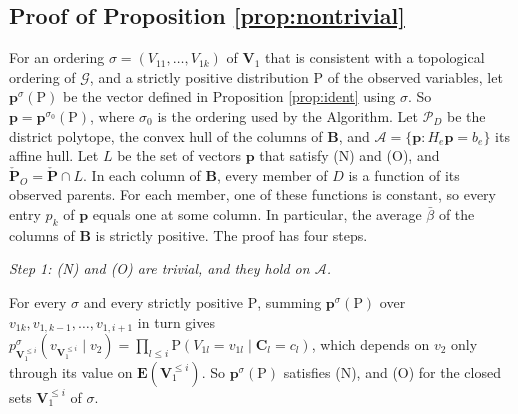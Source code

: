 \documentclass[12pt]{article}
\def\Pr{{\mathrm{P}}}
\newcommand{\bV}{\boldsymbol{V}}
\begin{document}
\subsection*{Proof of Proposition \ref{prop:nontrivial}}

For an ordering $\sigma = (V_{11}, \ldots, V_{1k})$ of $\bV_1$ that is consistent with a topological ordering of $\mathcal{G}$, and a strictly positive distribution $\Pr$ of the observed variables, let $\boldsymbol{p}^\sigma(\Pr)$ be the vector defined in Proposition \ref{prop:ident} using $\sigma$. So $\boldsymbol{p} = \boldsymbol{p}^{\sigma_0}(\Pr)$, where $\sigma_0$ is the ordering used by the Algorithm. Let $\mathcal{P}_D$ be the district polytope, the convex hull of the columns of $\boldsymbol{B}$, and $\mathcal{A} = \{\boldsymbol{p} : H_e \boldsymbol{p} = b_e\}$ its affine hull. Let $L$ be the set of vectors $\boldsymbol{p}$ that satisfy (N) and (O), and $\boldsymbol{\check{P}}_O = \boldsymbol{\check{P}} \cap L$. In each column of $\boldsymbol{B}$, every member of $D$ is a function of its observed parents. For each member, one of these functions is constant, so every entry $p_k$ of $\boldsymbol{p}$ equals one at some column. In particular, the average $\bar\beta$ of the columns of $\boldsymbol{B}$ is strictly positive. The proof has four steps.

\emph{Step 1: (N) and (O) are trivial, and they hold on $\mathcal{A}$.} 

For every $\sigma$ and every strictly positive $\Pr$, summing $\boldsymbol{p}^\sigma(\Pr)$ over $v_{1k}, v_{1,k-1}, \ldots, v_{1,i+1}$ in turn gives $p^\sigma_{\bV_1^{\leq i}}(v_{\bV_1^{\leq i}} \mid v_2) = \prod_{l \leq i} \Pr(V_{1l} = v_{1l} \mid \boldsymbol{C}_l = c_l)$, which depends on $v_2$ only through its value on $\boldsymbol{E}(\bV_1^{\leq i})$. So $\boldsymbol{p}^\sigma(\Pr)$ satisfies (N), and (O) for the closed sets $\bV_1^{\leq i}$ of $\sigma$.
\end{document}
